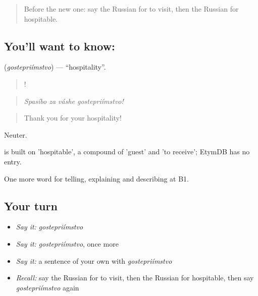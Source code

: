 \label{lesson:RU-C499-gostepriimstvo}



\begin{quote}
Before the new one: say the Russian for to visit, then the Russian for hospitable.
\end{quote}

\subsection*{You'll want to know: }
\textbf{} (\emph{gostepriímstvo}) — \textquotedblleft{}hospitality\textquotedblright{}.

\begin{quote}
   !
\end{quote}

\begin{quote}
\emph{Spasíbo za váshe gostepriímstvo!}
\end{quote}

\begin{quote}
Thank you for your hospitality!
\end{quote}

Neuter.

\begin{cousinweb}
\emph{} is built on \emph{} 'hospitable', a compound of \emph{} 'guest' and \emph{} 'to receive'; EtymDB has no entry.
\end{cousinweb}

\begin{grammarlens}[title={What you've built}]
One more word for telling, explaining and describing at B1.
\end{grammarlens}

\subsection*{Your turn}
\begin{itemize}
\raggedright
  \item \emph{Say it:} \emph{gostepriímstvo}
  \item \emph{Say it:} \emph{gostepriímstvo}, once more
  \item \emph{Say it:} a sentence of your own with \emph{gostepriímstvo}
  \item \emph{Recall:} say the Russian for to visit, then the Russian for hospitable, then say \emph{gostepriímstvo} again
\end{itemize}

